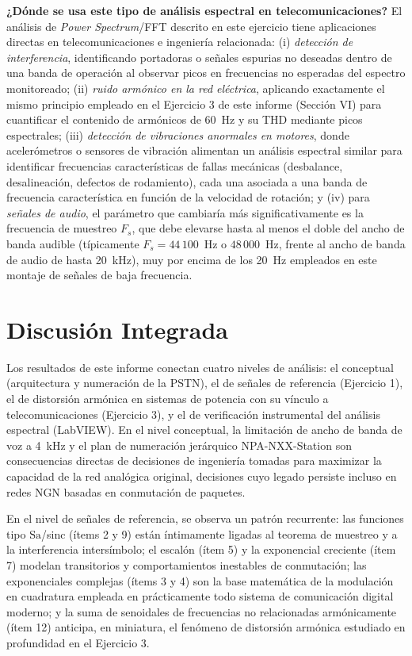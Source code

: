 \documentclass[conference]{IEEEtran}
\begin{document}
\textbf{¿Dónde se usa este tipo de análisis espectral en telecomunicaciones?} El análisis de \textit{Power Spectrum}/FFT descrito en este ejercicio tiene aplicaciones directas en telecomunicaciones e ingeniería relacionada: (i) \textit{detección de interferencia}, identificando portadoras o señales espurias no deseadas dentro de una banda de operación al observar picos en frecuencias no esperadas del espectro monitoreado; (ii) \textit{ruido armónico en la red eléctrica}, aplicando exactamente el mismo principio empleado en el Ejercicio 3 de este informe (Sección VI) para cuantificar el contenido de armónicos de 60~Hz y su THD mediante picos espectrales; (iii) \textit{detección de vibraciones anormales en motores}, donde acelerómetros o sensores de vibración alimentan un análisis espectral similar para identificar frecuencias características de fallas mecánicas (desbalance, desalineación, defectos de rodamiento), cada una asociada a una banda de frecuencia característica en función de la velocidad de rotación; y (iv) para \textit{señales de audio}, el parámetro que cambiaría más significativamente es la frecuencia de muestreo $F_s$, que debe elevarse hasta al menos el doble del ancho de banda audible (típicamente $F_s=44\,100$~Hz o $48\,000$~Hz, frente al ancho de banda de audio de hasta 20~kHz), muy por encima de los 20~Hz empleados en este montaje de señales de baja frecuencia.

\section{Discusión Integrada}

Los resultados de este informe conectan cuatro niveles de análisis: el conceptual (arquitectura y numeración de la PSTN), el de señales de referencia (Ejercicio 1), el de distorsión armónica en sistemas de potencia con su vínculo a telecomunicaciones (Ejercicio 3), y el de verificación instrumental del análisis espectral (LabVIEW). En el nivel conceptual, la limitación de ancho de banda de voz a 4~kHz y el plan de numeración jerárquico NPA-NXX-Station son consecuencias directas de decisiones de ingeniería tomadas para maximizar la capacidad de la red analógica original, decisiones cuyo legado persiste incluso en redes NGN basadas en conmutación de paquetes.

En el nivel de señales de referencia, se observa un patrón recurrente: las funciones tipo $\text{Sa}$/sinc (ítems 2 y 9) están íntimamente ligadas al teorema de muestreo y a la interferencia intersímbolo; el escalón (ítem 5) y la exponencial creciente (ítem 7) modelan transitorios y comportamientos inestables de conmutación; las exponenciales complejas (ítems 3 y 4) son la base matemática de la modulación en cuadratura empleada en prácticamente todo sistema de comunicación digital moderno; y la suma de senoidales de frecuencias no relacionadas armónicamente (ítem 12) anticipa, en miniatura, el fenómeno de distorsión armónica estudiado en profundidad en el Ejercicio 3.
\end{document}
